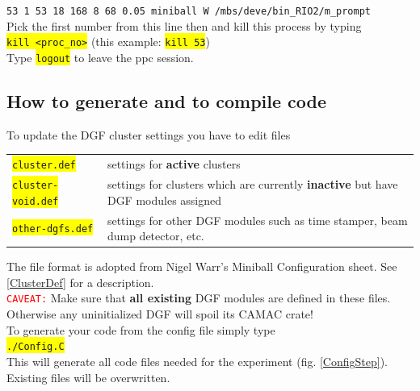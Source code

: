 \documentclass[10pt]{article}
\newcommand{\yellow}[1]{\colorbox{yellow}{\texttt{#1}}}
\newcommand{\redt}[1]{\textcolor{red}{\texttt{#1}}}
\begin{document}
\hspace{2cm}\texttt{53    1   53  18  168     8   68      0.05       miniball W /mbs/deve/bin\_RIO2/m\_prompt}\\

Pick the first number from this line then and kill this process by typing\\

\hspace*{.2\linewidth}\yellow{kill <proc\_no>}
\hspace{1cm}(this example: \yellow{kill 53})\\

Type \yellow{logout} to leave the ppc session.

\subsection{How to generate and to compile code}\label{GenerateAndCompileCode}\vspace{3mm}

To update the DGF cluster settings you have to edit files
\begin{center}
\begin{tabular}{ll}		
\yellow{cluster.def}		&	settings for \textbf{active} clusters\\
\yellow{cluster-void.def}	&	settings for clusters which are currently \textbf{inactive} but have DGF modules assigned\\
\yellow{other-dgfs.def}		&	settings for other DGF modules such as time stamper, beam dump detector, etc.\\
\end{tabular}
\end{center}
The file format is adopted from Nigel Warr's Miniball Configuration sheet. See \ref{ClusterDef} for a description.\\

\redt{CAVEAT:}
Make sure that \textbf{all existing} DGF modules are defined in these files. Otherwise any uninitialized DGF will spoil its CAMAC crate!\\

To generate your code from the config file simply type\\

\hspace*{.2\linewidth}\yellow{./Config.C} \\

This will generate all code files needed for the experiment (fig. \ref{ConfigStep}). Existing files will be overwritten.\\
\end{document}
